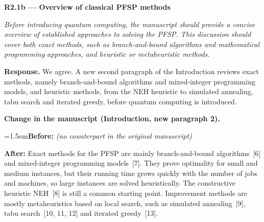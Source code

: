 \documentclass[12pt]{article}
\newenvironment{rc}[1]{\par\medskip\noindent\textbf{#1}\par\nopagebreak\noindent\itshape\renewcommand{\emph}[1]{\textbf{##1}}\ignorespaces}{\par}
\newcommand{\answer}[1]{\par\smallskip\noindent\textbf{Response.} #1\par}
\newcommand{\change}[3]{\par\smallskip\noindent\textbf{Change in the manuscript (#1).}\par
  {\leftskip=1.5em\noindent\textbf{Before:} #2\par\noindent\textbf{After:} #3\par}}
\begin{document}
\begin{rc}{R2.1b --- Overview of classical PFSP methods}
Before introducing quantum computing, the manuscript should provide a concise overview of established approaches to solving the PFSP. This discussion should cover both exact methods, such as branch-and-bound algorithms and mathematical programming approaches, and heuristic or metaheuristic methods.
\end{rc}
\answer{We agree. A new second paragraph of the Introduction reviews exact methods, namely branch-and-bound algorithms and mixed-integer programming models, and heuristic methods, from the NEH heuristic to simulated annealing, tabu search and iterated greedy, before quantum computing is introduced.}
\change{Introduction, new paragraph 2}{\textit{(no counterpart in the original manuscript)}}{Exact methods for the PFSP are mainly branch-and-bound algorithms~[6] and mixed-integer programming models~[7]. They prove optimality for small and medium instances, but their running time grows quickly with the number of jobs and machines, so large instances are solved heuristically. The constructive heuristic NEH~[8] is still a common starting point. Improvement methods are mostly metaheuristics based on local search, such as simulated annealing~[9], tabu search~[10, 11, 12] and iterated greedy~[13].}
\end{document}
